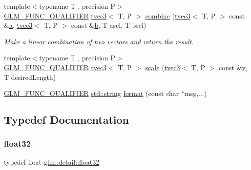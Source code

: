 \begin{DoxyCompactItemize}
\item 
{\footnotesize template$<$typename T , precision P$>$ }\\\mbox{\hyperlink{setup_8hpp_a33fdea6f91c5f834105f7415e2a64407}{G\+L\+M\+\_\+\+F\+U\+N\+C\+\_\+\+Q\+U\+A\+L\+I\+F\+I\+ER}} \mbox{\hyperlink{structglm_1_1tvec3}{tvec3}}$<$ T, P $>$ \mbox{\hyperlink{namespaceglm_1_1detail_ae1c6c18912ed1a03fc850bb11755213c}{combine}} (\mbox{\hyperlink{structglm_1_1tvec3}{tvec3}}$<$ T, P $>$ const \&\mbox{\hyperlink{glad_8h_ac8729153468b5dcf13f971b21d84d4e5}{a}}, \mbox{\hyperlink{structglm_1_1tvec3}{tvec3}}$<$ T, P $>$ const \&\mbox{\hyperlink{glad_8h_a6eba317e3cf44d6d26c04a5a8f197dcb}{b}}, T ascl, T bscl)
\begin{DoxyCompactList}\small\item\em Make a linear combination of two vectors and return the result. \end{DoxyCompactList}\item 
{\footnotesize template$<$typename T , precision P$>$ }\\\mbox{\hyperlink{setup_8hpp_a33fdea6f91c5f834105f7415e2a64407}{G\+L\+M\+\_\+\+F\+U\+N\+C\+\_\+\+Q\+U\+A\+L\+I\+F\+I\+ER}} \mbox{\hyperlink{structglm_1_1tvec3}{tvec3}}$<$ T, P $>$ \mbox{\hyperlink{namespaceglm_1_1detail_af47639907c02055dc95ef962e0ca9a02}{scale}} (\mbox{\hyperlink{structglm_1_1tvec3}{tvec3}}$<$ T, P $>$ const \&\mbox{\hyperlink{glad_8h_a14cfbe2fc2234f5504618905b69d1e06}{v}}, T desired\+Length)
\item 
\mbox{\hyperlink{setup_8hpp_a33fdea6f91c5f834105f7415e2a64407}{G\+L\+M\+\_\+\+F\+U\+N\+C\+\_\+\+Q\+U\+A\+L\+I\+F\+I\+ER}} \mbox{\hyperlink{glad_8h_ac83513893df92266f79a515488701770}{std\+::string}} \mbox{\hyperlink{namespaceglm_1_1detail_acd5305bbd1c5417b1eb770faf8229d14}{format}} (const char $\ast$msg,...)
\end{DoxyCompactItemize}


\subsection{Typedef Documentation}
\mbox{\label{namespaceglm_1_1detail_ad60558c5c304624de0b54c51b5857737}} 
\subsubsection{\texorpdfstring{float32}{float32}}
{\footnotesize\ttfamily typedef float \mbox{\hyperlink{namespaceglm_1_1detail_ad60558c5c304624de0b54c51b5857737}{glm\+::detail\+::float32}}}



